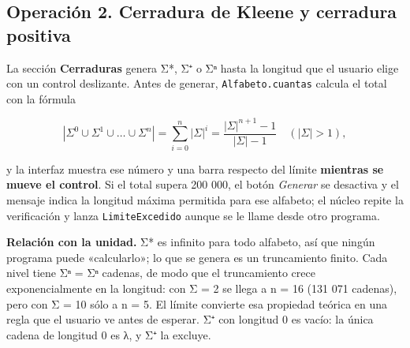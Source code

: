 \hypertarget{operaciuxf3n-2.-cerradura-de-kleene-y-cerradura-positiva}{%
\subsection{Operación 2. Cerradura de Kleene y cerradura positiva}\label{operaciuxf3n-2.-cerradura-de-kleene-y-cerradura-positiva}}

La sección \textbf{Cerraduras} genera Σ*, Σ⁺ o Σⁿ hasta la longitud que el usuario elige con un control deslizante. Antes de generar, \texttt{Alfabeto.cuantas} calcula el total con la fórmula

\[|\Sigma^0 \cup \Sigma^1 \cup \dots \cup \Sigma^n| = \sum_{i=0}^{n} |\Sigma|^i = \frac{|\Sigma|^{n+1} - 1}{|\Sigma| - 1} \quad (|\Sigma| > 1),\]

y la interfaz muestra ese número y una barra respecto del límite \textbf{mientras se mueve el control}. Si el total supera 200 000, el botón \emph{Generar} se desactiva y el mensaje indica la longitud máxima permitida para ese alfabeto; el núcleo repite la verificación y lanza \texttt{LimiteExcedido} aunque se le llame desde otro programa.

\begin{Shaded}
\begin{Highlighting}[]
\OperatorTok{=}
 \OperatorTok{\textgreater{}}
    \SpecialCharTok{\{}\SpecialCharTok{\}}\SpecialCharTok{\{}\SpecialCharTok{\}}\NormalTok{)}
\end{Highlighting}
\end{Shaded}

\textbf{Relación con la unidad.} Σ* es infinito para todo alfabeto, así que ningún programa puede «calcularlo»; lo que se genera es un truncamiento finito. Cada nivel tiene \textbar Σⁿ\textbar{} = \textbar Σ\textbar ⁿ cadenas, de modo que el truncamiento crece exponencialmente en la longitud: con \textbar Σ\textbar{} = 2 se llega a n = 16 (131 071 cadenas), pero con \textbar Σ\textbar{} = 10 sólo a n = 5. El límite convierte esa propiedad teórica en una regla que el usuario ve antes de esperar. Σ⁺ con longitud 0 es vacío: la única cadena de longitud 0 es λ, y Σ⁺ la excluye.

